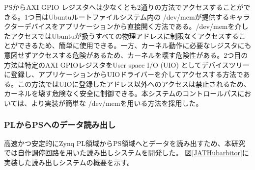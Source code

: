 PSからAXI GPIO レジスタへは少なくとも2通りの方法でアクセスすることができる。1つ目はUbuntuルートファイルシステム内の /dev/memが提供するキャラクターデバイスをアプリケーションから直接開く方法である。/dev/memを介したアクセスではUbuntuが扱うすべての物理アドレスに制限なくアクセスすることができるため、簡単に使用できる。一方、カーネル動作に必要なレジスタにも意図せずアクセスする危険があるため、カーネルを壊す危険性がある。2つ目の方法は特定のAXI GPIOレジスタをUser space I/O (UIO) としてデバイスツリーに登録し、アプリケーションからUIOドライバーを介してアクセスする方法である。この方法ではUIOに登録したアドレス以外へのアクセスは禁止されるため、カーネルを壊す危険なく安全に制御できる。本システムのコントロールパスにおいては、より実装が簡単な /dev/memを用いる方法を採用した。


\subsubsection{PLからPSへのデータ読み出し}
\baselineskip
\label{subsubsec_readout}





高速かつ安定的にZynq PL領域からPS領域へとデータを読み出すため、本研究では自作調停回路を用いた読み出しシステムを開発した。
図\ref{JATHubarbitor}に実装した読み出しシステムの概要を示す。

